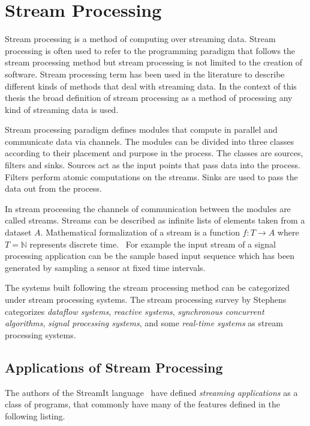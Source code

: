 \section{Stream Processing}
\label{sec:stream-processing}
Stream processing is a method of computing over streaming data. Stream processing is often used to refer to the programming paradigm that follows the stream processing method but stream processing is not limited to the creation of software. Stream processing term has been used in the literature to describe different kinds of methods that deal with streaming data. In the context of this thesis the broad definition of stream processing as a method of processing any kind of streaming data is used. 

Stream processing paradigm defines modules that compute in parallel and communicate data via channels. The modules can be divided into three classes according to their placement and purpose in the process. The classes are sources, filters and sinks. Sources act as the input points that pass data into the process. Filters perform atomic computations on the streams. Sinks are used to pass the data out from the process.~\cite{stephens1997survey}

In stream processing the channels of communication between the modules are called streams. Streams can be described as infinite lists of elements taken from a dataset $A$. Mathematical formalization of a stream is a function $f:T \rightarrow A$ where $T = \mathbb{N}$ represents discrete time.~\cite{stephens1997survey} For example the input stream of a signal processing application can be the sample based input sequence which has been generated by sampling a sensor at fixed time intervals.

The systems built following the stream processing method can be categorized under stream processing systems. The stream processing survey by Stephens \cite{stephens1997survey} categorizes \textit{dataflow systems}, \textit{reactive systems}, \textit{synchronous concurrent algorithms}, \textit{signal processing systems}, and some \textit{real-time systems} as stream processing systems. 

\subsection{Applications of Stream Processing}
\label{subsec:streaming-applications}
The authors of the StreamIt language~\cite{thies2002streamit} have defined \textit{streaming applications} as a class of programs, that commonly have many of the features defined in the following listing.

